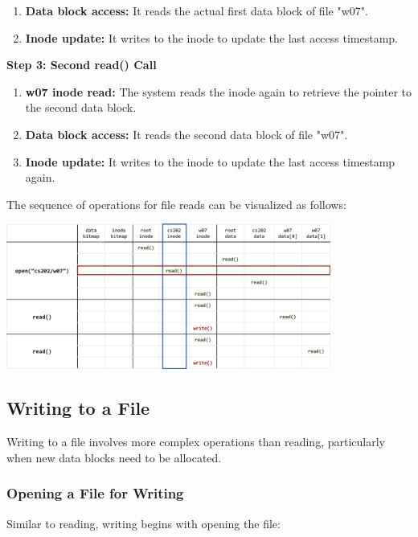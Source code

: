 \documentclass[../../compsys.tex]{subfiles}
\begin{document}
\begin{example}
\begin{enumerate}
    \item \textbf{Data block access:} It reads the actual first data block of file "w07".
    
    \item \textbf{Inode update:} It writes to the inode to update the last access timestamp.
\end{enumerate}

\textbf{Step 3: Second read() Call}
\begin{enumerate}
    \item \textbf{w07 inode read:} The system reads the inode again to retrieve the pointer to the second data block.
    
    \item \textbf{Data block access:} It reads the second data block of file "w07".
    
    \item \textbf{Inode update:} It writes to the inode to update the last access timestamp again.
\end{enumerate}
\end{example}

The sequence of operations for file reads can be visualized as follows:

\begin{center}
  \includegraphics[width=0.8\textwidth]{chapters/L7/images/read.png}
\end{center}

\subsection{Writing to a File}
Writing to a file involves more complex operations than reading, particularly when new data blocks need to be allocated.

\subsubsection{Opening a File for Writing}
Similar to reading, writing begins with opening the file:
\end{document}
